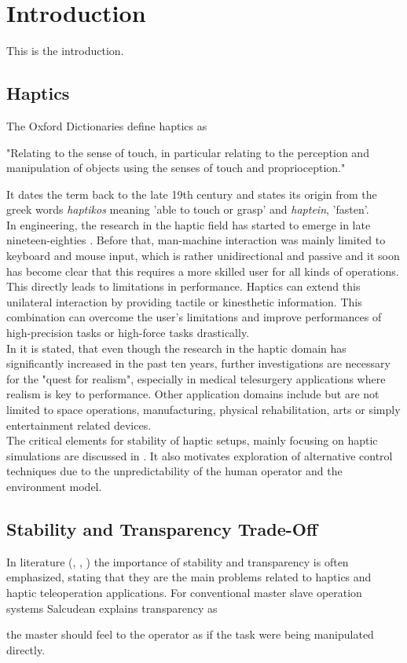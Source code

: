 \section{Introduction}
This is the introduction.

\subsection{Haptics}
The Oxford Dictionaries define haptics as 

\begin{displayquote}
"Relating to the sense of touch, in particular relating to the perception and manipulation of objects using the senses of touch and proprioception." \cite{Oxford}
\end{displayquote}
It dates the term back to the late 19th century	and states its origin from the greek words \textit{haptikos} meaning 'able to touch or grasp' and \textit{haptein}, 'fasten'.\\
In engineering, the research in the haptic field has started to emerge in late nineteen-eighties \cite{Srinivasan1995}. Before that, man-machine interaction was mainly limited to keyboard and mouse input, which is rather unidirectional and passive and it soon has become clear that this requires a more skilled user for all kinds of operations. This directly leads to limitations in performance. Haptics can extend this unilateral interaction by providing tactile or kinesthetic information. This combination can overcome the user's limitations and improve performances of high-precision tasks or high-force tasks drastically.\\
In \cite{Hayward2004} it is stated, that even though the research in the haptic domain has significantly increased in the past ten years, further investigations are necessary for the "quest for realism", especially in medical telesurgery applications where realism is key to performance. Other application domains include but are not limited to space operations, manufacturing, physical rehabilitation, arts or simply entertainment related devices.\\
The critical elements for stability of haptic setups, mainly focusing on haptic simulations are discussed in \cite{Adams1998}. It also motivates exploration of alternative control techniques due to the unpredictability of the human operator and the environment model.


\subsection{Stability and Transparency Trade-Off}
In literature (\cite{Salcudean2000},  \cite{Christiansson2007}, \cite{Enayati2016})  the importance of stability and transparency is often emphasized, stating that they are the main problems related to haptics and haptic teleoperation applications. For conventional master slave operation systems Salcudean explains transparency as \begin{displayquote}
\textelp{} the master should feel to the operator as if the task were being manipulated directly.\cite{Salcudean2000}
\end{displayquote}

